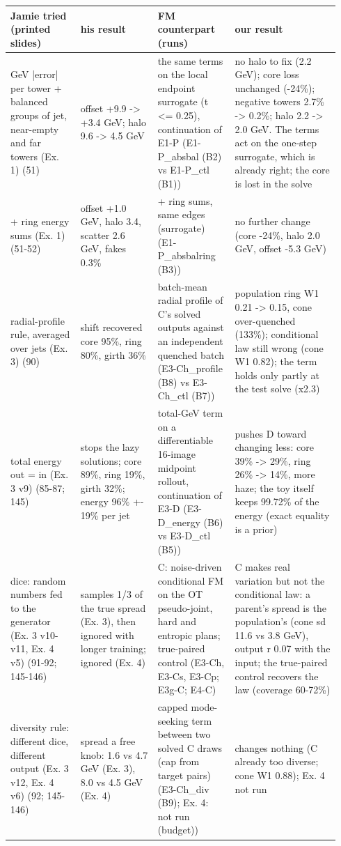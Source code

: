 \tiny
\setlength{\tabcolsep}{2.5pt}
\begin{tabular}{p{0.2\linewidth}p{0.22\linewidth}p{0.22\linewidth}p{0.3\linewidth}}
\toprule
Jamie tried (printed slides) & his result & FM counterpart (runs) & our result \\
\midrule
GeV |error| per tower + balanced groups of jet, near-empty and far towers (Ex. 1) (51) & offset +9.9 -> +3.4 GeV; halo 9.6 -> 4.5 GeV & the same terms on the local endpoint surrogate (t <= 0.25), continuation of E1-P (E1-P\_absbal (B2) vs E1-P\_ctl (B1)) & no halo to fix (2.2 GeV); core loss unchanged (-24\%); negative towers 2.7\% -> 0.2\%; halo 2.2 -> 2.0 GeV. The terms act on the one-step surrogate, which is already right; the core is lost in the solve \\
+ ring energy sums (Ex. 1) (51-52) & offset +1.0 GeV, halo 3.4, scatter 2.6 GeV, fakes 0.3\% & + ring sums, same edges (surrogate) (E1-P\_absbalring (B3)) & no further change (core -24\%, halo 2.0 GeV, offset -5.3 GeV) \\
radial-profile rule, averaged over jets (Ex. 3) (90) & shift recovered core 95\%, ring 80\%, girth 36\% & batch-mean radial profile of C's solved outputs against an independent quenched batch (E3-Ch\_profile (B8) vs E3-Ch\_ctl (B7)) & population ring W1 0.21 -> 0.15, cone over-quenched (133\%); conditional law still wrong (cone W1 0.82); the term holds only partly at the test solve (x2.3) \\
total energy out = in (Ex. 3 v9) (85-87; 145) & stops the lazy solutions; core 89\%, ring 19\%, girth 32\%; energy 96\% +- 19\% per jet & total-GeV term on a differentiable 16-image midpoint rollout, continuation of E3-D (E3-D\_energy (B6) vs E3-D\_ctl (B5)) & pushes D toward changing less: core 39\% -> 29\%, ring 26\% -> 14\%, more haze; the toy itself keeps 99.72\% of the energy (exact equality is a prior) \\
dice: random numbers fed to the generator (Ex. 3 v10-v11, Ex. 4 v5) (91-92; 145-146) & samples 1/3 of the true spread (Ex. 3), then ignored with longer training; ignored (Ex. 4) & C: noise-driven conditional FM on the OT pseudo-joint, hard and entropic plans; true-paired control (E3-Ch, E3-Cs, E3-Cp; E3g-C; E4-C) & C makes real variation but not the conditional law: a parent's spread is the population's (cone sd 11.6 vs 3.8 GeV), output r 0.07 with the input; the true-paired control recovers the law (coverage 60-72\%) \\
diversity rule: different dice, different output (Ex. 3 v12, Ex. 4 v6) (92; 145-146) & spread a free knob: 1.6 vs 4.7 GeV (Ex. 3), 8.0 vs 4.5 GeV (Ex. 4) & capped mode-seeking term between two solved C draws (cap from target pairs) (E3-Ch\_div (B9); Ex. 4: not run (budget)) & changes nothing (C already too diverse; cone W1 0.88); Ex. 4 not run \\

\end{tabular}
